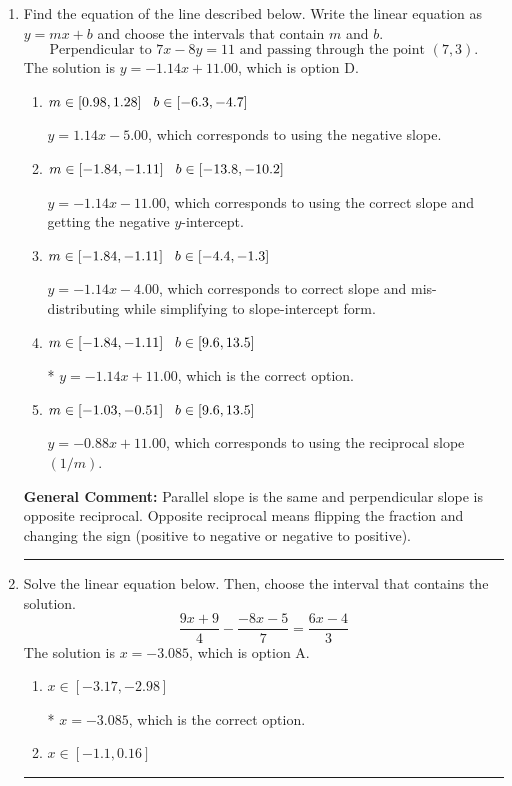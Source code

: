 \documentclass{extbook}[14pt]
\newcommand{\litem}[1]{\item #1

\rule{\textwidth}{0.4pt}}
\begin{document}
\begin{enumerate}\litem{
Find the equation of the line described below. Write the linear equation as $ y=mx+b $ and choose the intervals that contain $m$ and $b$.
\[ \text{Perpendicular to } 7 x - 8 y = 11 \text{ and passing through the point } (7, 3). \]
The solution is \( y = -1.14x + 11.00 \), which is option D.\begin{enumerate}[label=\Alph*.]
\item \( m \in [0.98, 1.28] \hspace*{3mm} b \in [-6.3, -4.7] \)

 $y = 1.14x - 5.00$, which corresponds to using the negative slope.
\item \( m \in [-1.84, -1.11] \hspace*{3mm} b \in [-13.8, -10.2] \)

 $y = -1.14x - 11.00$, which corresponds to using the correct slope and getting the negative $y$-intercept.
\item \( m \in [-1.84, -1.11] \hspace*{3mm} b \in [-4.4, -1.3] \)

 $y = -1.14x - 4.00$, which corresponds to correct slope and mis-distributing while simplifying to slope-intercept form.
\item \( m \in [-1.84, -1.11] \hspace*{3mm} b \in [9.6, 13.5] \)

* $y = -1.14x + 11.00$, which is the correct option.
\item \( m \in [-1.03, -0.51] \hspace*{3mm} b \in [9.6, 13.5] \)

 $y = -0.88x + 11.00$, which corresponds to using the reciprocal slope $(1/m)$.
\end{enumerate}

\textbf{General Comment:} Parallel slope is the same and perpendicular slope is opposite reciprocal. Opposite reciprocal means flipping the fraction and changing the sign (positive to negative or negative to positive).
}
\litem{
Solve the linear equation below. Then, choose the interval that contains the solution.
\[ \frac{9x + 9}{4} - \frac{-8x -5}{7} = \frac{6x -4}{3} \]
The solution is \( x = -3.085 \), which is option A.\begin{enumerate}[label=\Alph*.]
\item \( x \in [-3.17, -2.98] \)

* $x = -3.085$, which is the correct option.
\item \( x \in [-1.1, 0.16] \)


\end{enumerate}}
\end{enumerate}
\end{document}
